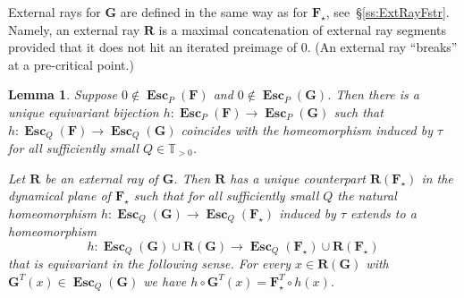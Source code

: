 \documentclass{amsart}
\newcommand{\1}{{\mathbb 1 }}
\newcommand\PT{\mathbb{ T}}
\newcommand{\bF}{{\mathbf F}}
\newcommand{\bR}{{\mathbf R}}
\newcommand{\bG}{{\mathbf G}}
\newcommand{\str}{{\star}}
\newtheorem{lem}[thm]{Lemma}
\theoremstyle{remark}
\numberwithin{equation}{section}
\theoremstyle{definition}
\newcommand{\Esc}{{\boldsymbol{\operatorname{Esc}}}}
\theoremstyle{nonumberbreak}
\begin{document}
External rays for $\bG$ are defined in the same way as for $\bF_\str$, see~\S\ref{ss:ExtRayFstr}. Namely, an external ray $\bR$ is a maximal concatenation of external ray segments provided that it does not hit an iterated preimage of $0$. (An external ray ``breaks'' at a pre-critical point.)

\begin{lem}
\label{lem:Esc:Lifting}
Suppose $0\not \in \Esc_P(\bF)$ and $0\not \in \Esc_P(\bG)$. Then there is a unique equivariant bijection $h\colon \Esc_P(\bF)\to\Esc_P(\bG)$ such that $h\colon \Esc_Q(\bF)\to\Esc_Q(\bG)$ coincides with the homeomorphism induced by $\tau$ for all sufficiently small $Q\in\PT_{>0}$.


Let $\bR$ be an external ray of $\bG$. Then $\bR$ has a unique counterpart $\bR(\bF_\str)$ in the dynamical plane of $\bF_\str$ such that for all sufficiently small $Q$ the natural homeomorphism $h\colon \Esc_Q (\bG)\to \Esc_Q(\bF_\str)$ induced by $\tau$ extends to a homeomorphism \[h\colon \Esc_Q(\bG)\cup \bR (\bG)\to \Esc_Q(\bF_\str)\cup \bR (\bF_\str)\]
that is equivariant in the following sense. For every $x\in \bR(\bG)$ with $\bG^T(x)\in \Esc_Q(\bG)$ we have $h\circ \bG^T(x)=\bF_\str^T \circ h(x)$.
\end{lem}
\end{document}
